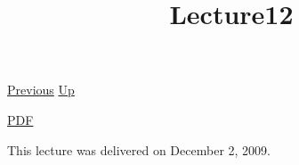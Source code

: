 \documentclass[12pt,a4paper]{report}
\begin{document}
 \href{doc/phil/People/Brandom/OnSellars/2009/Lecture11.html}{Previous} 
 \href{doc/phil/People/Brandom/OnSellars/2009.html}{Up} 

 \href{doc/phil/People/Brandom/OnSellars/2009/Lecture12.pdf}{PDF} 
\title{Lecture12}

\tableofcontents
This lecture was delivered on December 2, 2009.
\end{document}
